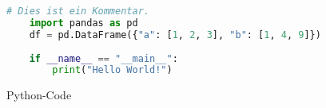 \documentclass{article}
\begin{document}
\lipsum[1-3]

\begin{figure}
  \centering
  \begin{lstlisting}[language=Python]
    # Dies ist ein Kommentar.
    import pandas as pd
    df = pd.DataFrame({"a": [1, 2, 3], "b": [1, 4, 9]})
       
    if __name__ == "__main__":
        print("Hello World!")
  \end{lstlisting}
  \caption{Python-Code}
  \label{lst:python-code}
\end{figure}
\end{document}
